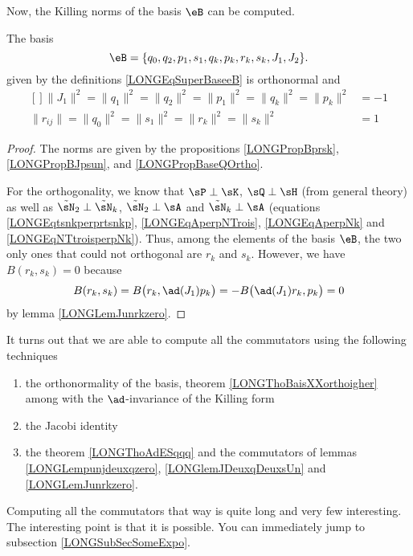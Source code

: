 Now, the Killing norms of the basis $\eB$ can be computed.
\begin{theorem}		\label{LONGThoBaisXXorthoigher}
	The basis
	\begin{equation}
		\eB=\{ q_0,q_2,p_1,s_1,q_k,p_k,r_k,s_k,J_1,J_2 \}.
	\end{equation}
	given by the definitions \eqref{LONGEqSuperBaseeB}  is orthonormal and
	\begin{equation}
		\begin{aligned}[]
			\| J_1 \|^2=\| q_1 \|^2=\| q_2 \|^2=\| p_1 \|^2=\| q_k \|^2=\| p_k \|^2&=-1\\
			\| r_{ij} \|=\| q_0 \|^2=\| s_1 \|^2=\| r_k \|^2=\| s_k \|^2&=1
			\end{aligned}
	\end{equation}
\end{theorem}

\begin{proof}
	The norms are given by the propositions \ref{LONGPropBprsk}, \ref{LONGPropBJpsun}, and \ref{LONGPropBaseQOrtho}.

	For the orthogonality, we know that $\sP\perp\sK$, $\sQ\perp\sH$ (from general theory) as well as $\tilde\sN_2\perp\tilde\sN_k$, $\tilde\sN_2\perp\sA$ and $\tilde\sN_k\perp\sA$ (equations \eqref{LONGEqtsnkperprtsnkp}, \eqref{LONGEqAperpNTrois}, \eqref{LONGEqAperpNk} and \eqref{LONGEqNTtroisperpNk}). Thus, among the elements of the basis $\eB$, the two only ones that could not orthogonal are $r_k$ and $s_k$. However, we have $B(r_k,s_k)=0$ because
	\begin{equation}
		B(r_k,s_k)=B\big( r_k,\ad(J_1)p_k \big)=-B\big( \ad(J_1)r_k,p_k \big)=0
	\end{equation}
	by lemma \ref{LONGLemJunrkzero}. 

\end{proof}


It turns out that we are able to compute all the commutators using the following techniques
\begin{enumerate}

	\item
		the orthonormality of the basis, theorem \ref{LONGThoBaisXXorthoigher} among with the $\ad$-invariance of the Killing form
	\item
		the Jacobi identity
	\item
		the theorem \ref{LONGThoAdESqqq} and the commutators of lemmas \ref{LONGLempunjdeuxqzero}, \ref{LONGlemJDeuxqDeuxsUn} and \ref{LONGLemJunrkzero}.

\end{enumerate}
Computing all the commutators that way is quite long and very few interesting. The interesting point is that it is possible. You can immediately jump to subsection \ref{LONGSubSecSomeExpo}.

